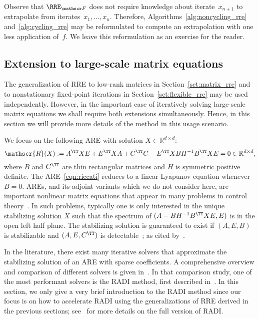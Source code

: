 Observe that $\RRE_{\mathscr F}$ does not require knowledge about iterate~$x_{n+1}$ to extrapolate from iterates~$x_1,\ldots,x_n$.
Therefore, Algorithms~\ref{alg:noncycling_rre} and~\ref{alg:cycling_rre} may be reformulated to compute an extrapolation with one less application of~$f$.
We leave this reformulation as an exercise for the reader.

\subsection{Extension to large-scale matrix equations}\label{sct:application}
The generalization of \ac{RRE} to low-rank matrices in Section~\ref{sct:matrix_rre} and to nonstationary fixed-point iterations in Section~\ref{sct:flexible_rre} may be used independently.
However, in the important case of iteratively solving large-scale matrix equations we shall require both extensions simultaneously.
Hence, in this section we will provide more details of the method in this usage scenario.

We focus on the following \ac{ARE} with solution $X \in \mathbb{R}^{d \times d}$:
\begin{equation}
	\mathscr{R}(X) := A^\TT X E + E^\TT X A + C^\TT C - E^\TT X B H^{-1} B^\TT X E = 0
	\in\mathbb{R}^{d\times d}
	,
	\label{eqn:riccati}
\end{equation}
where $B$ and $C^\TT$ are thin rectangular matrices and $H$ is symmetric positive definite.
The \ac{ARE}~\eqref{eqn:riccati} reduces to a linear Lyapunov equation whenever $B = 0$.
\acp{ARE}, and its adjoint variants which we do not consider here, are important nonlinear matrix equations that appear in many problems in control theory~\cite{Jungers2017historical}.
In such problems, typically one is only interested in the unique stabilizing solution $X$ such that the spectrum of $(A - B H^{-1} B^\TT X E, E)$ is in the open left half plane.
The stabilizing solution is guaranteed to exist if $(A, E, B)$ is stabilizable and $(A, E, C^\TT)$ is detectable~\cite{lancaster1995algebraic,BinIM12}; as cited by~\cite{benner2020numerical}.


In the literature, there exist many iterative solvers that approximate the stabilizing solution of an \ac{ARE} with sparse coefficients.
A comprehensive overview and comparison of different solvers is given in~\cite{benner2020numerical}.
In that comparison study, one of the most performant solvers is the RADI method, first described in~\cite{benner2018radi}.
In this section,
we only give a very brief introduction to the RADI method since our focus is on how to accelerate RADI using the generalizations of \ac{RRE}
derived in the previous sections;
see~\cite{benner2018radi} for more details on the full version of RADI\@.

